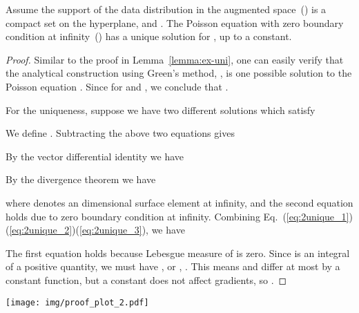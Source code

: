 \begin{lemma}
\label{lemma:data}
{Assume the support of the data distribution in the augmented space~() is a compact set on the  hyperplane,  and  . The Poisson equation  with zero boundary condition at infinity~() has a unique solution  for , up to a constant.}
\end{lemma}
\begin{proof}

Similar to the proof in Lemma~\ref{lemma:ex-uni}, one can easily verify that the analytical construction using Green's method, \ie , is one possible solution to the Poisson equation . Since  for   and , we conclude that .

For the uniqueness, suppose we have two different solutions  which satisfy 

We define . Subtracting the above two equations gives

By the vector differential identity we have

By the divergence theorem we have

where  denotes an  dimensional surface element at infinity, and the second equation holds due to zero boundary condition at infinity. Combining Eq.~(\ref{eq:2unique_1})(\ref{eq:2unique_2})(\ref{eq:2unique_3}), we have

The first equation holds because Lebesgue measure of  is zero. Since  is an integral of a positive quantity, we must have , or , . This means  and  differ at most by a constant function, but a constant does not affect gradients, so . \end{proof}


\begin{figure*}
    \centering
    \texttt{[image: img/proof\_plot\_2.pdf]}
    \caption{Proof idea of Theorem~\ref{theorem2}. By Gauss's Law, the outflow flux  equals the inflow flux . The factor of two in  is due to the symmetry of Poisson fields in  and .
    }
        \label{fig:theorem2}
\end{figure*}

